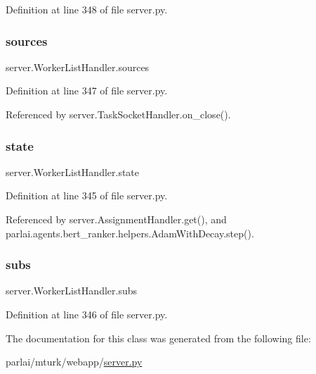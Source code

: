 Definition at line 348 of file server.\+py.

\mbox{\label{classserver_1_1WorkerListHandler_a91d0b6cd460f20dd204a8eae99a34852}} 
\subsubsection{\texorpdfstring{sources}{sources}}
{\footnotesize\ttfamily server.\+Worker\+List\+Handler.\+sources}



Definition at line 347 of file server.\+py.



Referenced by server.\+Task\+Socket\+Handler.\+on\+\_\+close().

\mbox{\label{classserver_1_1WorkerListHandler_a3d10f8de1ae4dbd639972512931b53b1}} 
\subsubsection{\texorpdfstring{state}{state}}
{\footnotesize\ttfamily server.\+Worker\+List\+Handler.\+state}



Definition at line 345 of file server.\+py.



Referenced by server.\+Assignment\+Handler.\+get(), and parlai.\+agents.\+bert\+\_\+ranker.\+helpers.\+Adam\+With\+Decay.\+step().

\mbox{\label{classserver_1_1WorkerListHandler_a8a1b224826f80c3c6ac6ac55e7eabdaa}} 
\subsubsection{\texorpdfstring{subs}{subs}}
{\footnotesize\ttfamily server.\+Worker\+List\+Handler.\+subs}



Definition at line 346 of file server.\+py.



The documentation for this class was generated from the following file\+:\begin{DoxyCompactItemize}
\item 
parlai/mturk/webapp/\hyperlink{server_8py}{server.\+py}\end{DoxyCompactItemize}
